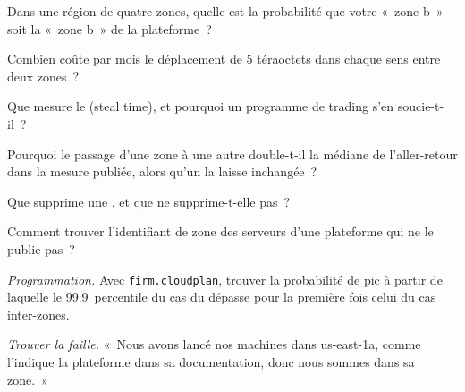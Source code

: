\begin{exercise}[$\star$]\label{exo:nw:trading-in-a-public-cloud:1}
Dans une région de quatre zones, quelle est la probabilité que votre «~zone b~» soit la «~zone b~» de la plateforme~?
\end{exercise}

\begin{exercise}[$\star$]\label{exo:nw:trading-in-a-public-cloud:2}
Combien coûte par mois le déplacement de 5 téraoctets dans chaque sens entre deux zones~?
\end{exercise}

\begin{exercise}[$\star$]\label{exo:nw:trading-in-a-public-cloud:3}
Que mesure le  (steal time), et pourquoi un programme de trading s'en soucie-t-il~?
\end{exercise}

\begin{exercise}[$\star\star$]\label{exo:nw:trading-in-a-public-cloud:4}
Pourquoi le passage d'une zone à une autre double-t-il la médiane de l'aller-retour dans la mesure publiée, alors qu'un  la laisse inchangée~?
\end{exercise}

\begin{exercise}[$\star\star$]\label{exo:nw:trading-in-a-public-cloud:5}
Que supprime une , et que ne supprime-t-elle pas~?
\end{exercise}

\begin{exercise}[$\star\star$]\label{exo:nw:trading-in-a-public-cloud:6}
Comment trouver l'identifiant de zone des serveurs d'une plateforme qui ne le publie pas~?
\end{exercise}

\begin{exercise}[$\star\star\star$]\label{exo:nw:trading-in-a-public-cloud:7}
\emph{Programmation.} Avec \texttt{firm.cloudplan}, trouver la probabilité de pic à partir de laquelle le 99.9~percentile du cas du  dépasse pour la première fois celui du cas
inter-zones.
\end{exercise}

\begin{exercise}[$\star\star\star$]\label{exo:nw:trading-in-a-public-cloud:8}
\emph{Trouver la faille.} «~Nous avons lancé nos machines dans us-east-1a, comme l'indique la plateforme dans sa documentation, donc nous sommes dans sa zone.~»
\end{exercise}

